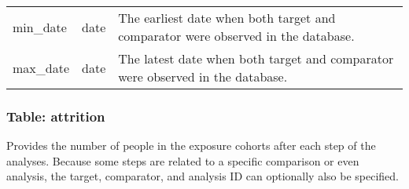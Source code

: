\documentclass[
]{article}
\begin{document}
\begin{longtable}[]{@{}lll@{}}
\begin{minipage}[t]{0.23\columnwidth}\raggedright
min\_date\strut
\end{minipage} & \begin{minipage}[t]{0.18\columnwidth}\raggedright
date\strut
\end{minipage} & \begin{minipage}[t]{0.50\columnwidth}\raggedright
The earliest date when both target and comparator were observed in the
database.\strut
\end{minipage}\tabularnewline
\begin{minipage}[t]{0.23\columnwidth}\raggedright
max\_date\strut
\end{minipage} & \begin{minipage}[t]{0.18\columnwidth}\raggedright
date\strut
\end{minipage} & \begin{minipage}[t]{0.50\columnwidth}\raggedright
The latest date when both target and comparator were observed in the
database.\strut
\end{minipage}\tabularnewline
\bottomrule
\end{longtable}

\hypertarget{table-attrition}{%
\subsubsection{Table: attrition}\label{table-attrition}}

Provides the number of people in the exposure cohorts after each step of
the analyses. Because some steps are related to a specific comparison or
even analysis, the target, comparator, and analysis ID can optionally
also be specified.
\end{document}
